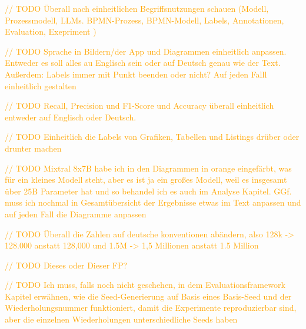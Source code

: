 \textcolor{orange}{// TODO Überall nach einheitlichen Begriffsnutzungen schauen (Modell, Prozessmodell, LLMs. BPMN-Prozess, BPMN-Modell, Labels, Annotationen, Evaluation, Exepriment )}

\textcolor{orange}{// TODO Sprache in Bildern/der App und Diagrammen einheitlich anpassen. Entweder es soll alles au Englisch sein oder auf Deutsch genau wie der Text. Außerdem: Labels immer mit Punkt beenden oder nicht? Auf jeden Falll einheitlich gestalten}

\textcolor{orange}{// TODO Recall, Precision und F1-Score und Accuracy überall einheitlich entweder auf Englisch oder Deutsch.}

\textcolor{orange}{// TODO Einheitlich die Labels von Grafiken, Tabellen und Listings drüber oder drunter machen}

\textcolor{orange}{// TODO Mixtral 8x7B habe ich in den Diagrammen in orange eingefärbt, was für ein kleines Modell steht, aber es ist ja ein großes Modell, weil es insgesamt über 25B Parameter hat und so behandel ich es auch im Analyse Kapitel. GGf. muss ich nochmal in Gesamtübersicht der Ergebnisse etwas im Text anpassen und auf jeden Fall die Diagramme anpassen}

\textcolor{orange}{// TODO Überall die Zahlen auf deutsche konventionen abändern, also 128k -> 128.000 anstatt 128,000 und 1.5M -> 1,5 Millionen anstatt 1.5 Million}

\textcolor{orange}{// TODO Dieses oder Dieser FP?}

\textcolor{orange}{// TODO Ich muss, falls noch nicht geschehen, in dem Evaluationsframework Kapitel erwähnen, wie die Seed-Generierung auf Basis eines Basis-Seed und der Wiederholungsnummer funktioniert, damit die Experimente reproduzierbar sind, aber die einzelnen Wiederholungen unterschiedliche Seeds haben}












